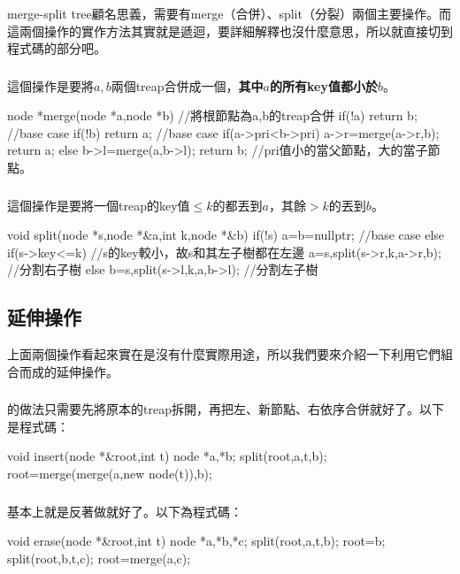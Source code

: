 \documentclass[main.tex]{subfiles}
\begin{document}
merge-split tree顧名思義，需要有merge（合併）、split（分裂）兩個主要操作。而這兩個操作的實作方法其實就是遞迴，要詳細解釋也沒什麼意思，所以就直接切到程式碼的部分吧。
\subsubsection{}
這個操作是要將$a,b$兩個treap合併成一個，\textbf{其中$a$的所有key值都小於$b$}。
\begin{C++}
node *merge(node *a,node *b){ //將根節點為a,b的treap合併
	if(!a) return b; //base case
	if(!b) return a; //base case
	if(a->pri<b->pri){
		a->r=merge(a->r,b);
		return a;
	}else{
		b->l=merge(a,b->l);
		return b;
	} //pri值小的當父節點，大的當子節點。
}
\end{C++}
\subsubsection{}
這個操作是要將一個treap的key值$\leq k$的都丟到$a$，其餘$>k$的丟到$b$。
\begin{C++}
void split(node *s,node *&a,int k,node *&b){
	if(!s) a=b=nullptr; //base case
	else if(s->key<=k) //s的key較小，故s和其左子樹都在左邊
		a=s,split(s->r,k,a->r,b); //分割右子樹
	else 
		b=s,split(s->l,k,a,b->l); //分割左子樹
}
\end{C++}
\subsection{延伸操作}
上面兩個操作看起來實在是沒有什麼實際用途，所以我們要來介紹一下利用它們組合而成的延伸操作。
\subsubsection{}
的做法只需要先將原本的treap拆開，再把左、新節點、右依序合併就好了。以下是程式碼：
\begin{C++}
void insert(node *&root,int t){
	node *a,*b;
	split(root,a,t,b);
	root=merge(merge(a,new node(t)),b);
}
\end{C++}
\subsubsection{}
基本上就是反著做就好了。以下為程式碼：
\begin{C++}
void erase(node *&root,int t){
	node *a,*b,*c;
	split(root,a,t,b);
	root=b;
	split(root,b,t,c);
	root=merge(a,c);
}
\end{C++}
\end{document}
